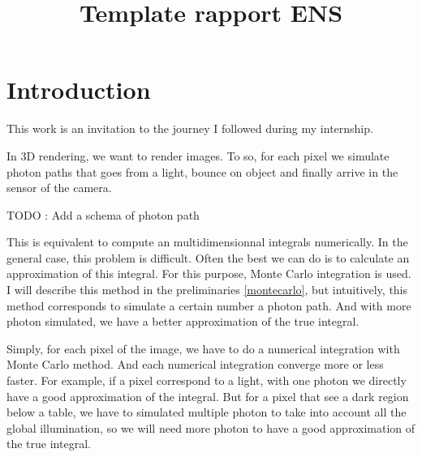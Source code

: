 \documentclass{classeENS}
\title{Template rapport ENS} %
\begin{document}

\matiere{} 
\motif{}

\tuteurpcp{}

        
\fairemarges %


\tabledematieres %

\section{Introduction}

This work is an invitation to the journey I followed during my internship. 

\par In 3D rendering, we want to render images. To so, for each pixel 
we simulate photon paths that goes from a light, bounce on object and finally 
arrive in the sensor of the camera.

{\color{red} TODO : Add a schema of photon path}

\par This is equivalent to compute an multidimensionnal integrals numerically. 
In the general case, this problem is difficult. Often the best we 
can do is to calculate an approximation of this integral. For this 
purpose, Monte Carlo integration is used. I will describe this method in
the preliminaries \ref{montecarlo}, but intuitively, this method corresponds
to simulate a certain number a photon path. And with more photon simulated, 
we have a better approximation of the true integral.

\par Simply, for each pixel of the image, we have to do a numerical
integration with Monte Carlo method. And each numerical integration
converge more or less faster. For example, if a pixel correspond to
a light, with one photon we directly have a good approximation of the
integral. But for a pixel that see a dark region below a table, we have
to simulated multiple photon to take into account all the global illumination, 
so we will need more photon to have a good approximation of the true integral.
\end{document}
